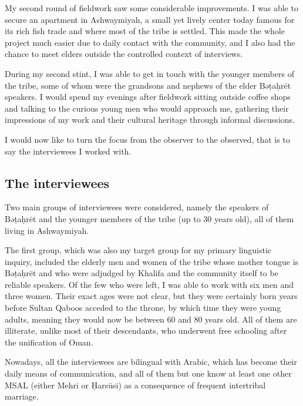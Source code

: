 \documentclass[output=paper]{langscibook}
\begin{document}
My second round of fieldwork saw some considerable improvements. I was able to secure an apartment in Ashwaymiyah, a small yet lively center today famous for its rich fish trade and where most of the tribe is settled. This made the whole project much easier due to daily contact with the community, and I also had the chance to meet elders outside the controlled context of interviews. 

During my second stint, I was able to get in touch with the younger members of the tribe, some of whom were the grandsons and nephews of the elder Bəṭaḥrēt speakers. I would spend my evenings after fieldwork sitting outside coffee shops and talking to the curious young men who would approach me, gathering their impressions of my work and their cultural heritage through informal discussions. 

I would now like to turn the focus from the observer to the observed, that is to say the interviewees I worked with.

\subsection{The interviewees}
Two main groups of interviewees were considered, namely the speakers of Bə\-ṭaḥ\-rēt and the younger members of the tribe (up to 30 years old), all of them living in Ashwaymiyah.

The first group, which was also my target group for my primary linguistic inquiry, included the elderly men and women of the tribe whose mother tongue is Bəṭaḥrēt and who were adjudged by Khalifa and the community itself to be reliable speakers. Of the few who were left, I was able to work with six men and three women. Their exact ages were not clear, but they were certainly born years before Sultan Qaboos acceded to the throne, by which time they were young adults, meaning they would now be between 60 and 80 years old. All of them are illiterate, unlike most of their descendants, who underwent free schooling after the unification of Oman. 

Nowadays, all the interviewees are bilingual with Arabic, which has become their daily means of communication, and all of them but one know at least one other MSAL (either Mehri or Ḥarsūsi) as a consequence of frequent intertribal marriage.
\end{document}
